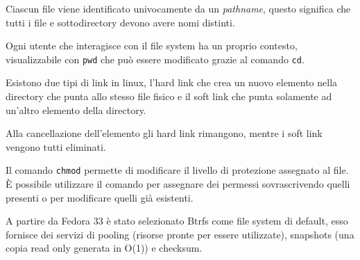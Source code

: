 \spacer
Ciascun file viene identificato univocamente da un \textit{pathname}, questo significa che tutti i file e sottodirectory devono avere nomi distinti.

\spacer
Ogni utente che interagisce con il file system ha un proprio contesto, visualizzabile con \texttt{pwd} che può essere modificato grazie al comando \texttt{cd}.

\spacer
Esistono due tipi di link in linux, l'hard link che crea un nuovo elemento nella directory che punta allo stesso file fisico e il soft link che punta solamente ad un'altro elemento della directory.

Alla cancellazione dell'elemento gli hard link rimangono, mentre i soft link vengono tutti eliminati.

\spacer
Il comando \texttt{chmod} permette di modificare il livello di protezione assegnato al file.
È possibile utilizzare il comando per assegnare dei permessi sovrascrivendo quelli presenti o per modificare quelli già esistenti.

\begin{note}
    A partire da Fedora 33 è stato selezionato Btrfs come file system di default, esso fornisce dei servizi di pooling (risorse pronte per essere utilizzate), snapshots (una copia read only generata in O(1)) e checksum.
\end{note}

